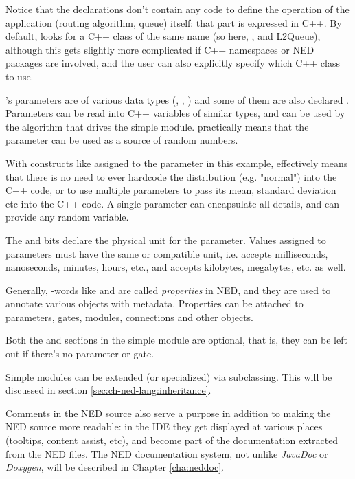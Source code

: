 Notice that the declarations don't contain any code to define the operation
of the application (routing algorithm, queue) itself:
that part is expressed in C++. By default, {\opp} looks for a
C++ class of the same name (so here, ,  and {L2Queue}),
although this gets slightly more complicated if C++ namespaces or
NED packages are involved, and the user can also explicitly specify
which C++ class to use.

's parameters are of various data types (, ,
) and some of them are also declared . Parameters
can be read into C++ variables of similar types, and can be used by the
algorithm that drives the simple module.  practically means
that the parameter can be used as a source of random numbers.

\begin{note}
    With constructs like  assigned to the 
    parameter in this example,  effectively means that
    there is no need to ever hardcode the distribution (e.g. "normal")
    into the C++ code, or to use multiple parameters to pass its mean,
    standard deviation etc into the C++ code. A single parameter can
    encapsulate all details, and can provide any random variable.
\end{note}

The  and  bits declare the physical unit
for the parameter. Values assigned to parameters must have the same or
compatible unit, i.e.  accepts milliseconds, nanoseconds,
minutes, hours, etc., and  accepts kilobytes, megabytes,
etc. as well.

Generally, -words like  and  are called
\textit{properties} in NED, and they are used to annotate various objects
with metadata. Properties can be attached to parameters, gates, modules,
connections and other objects.

Both the  and  sections in the simple module are
optional, that is, they can be left out if there's no parameter or gate.

Simple modules can be extended (or specialized) via subclassing. This will be
discussed in section \ref{sec:ch-ned-lang:inheritance}.

Comments in the NED source also serve a purpose in addition to making
the NED source more readable: in the {\opp} IDE they get displayed
at various places (tooltips, content assist, etc), and become part
of the documentation extracted from the NED files.
The NED documentation system, not unlike \textit{JavaDoc}
or \textit{Doxygen}, will be described in Chapter \ref{cha:neddoc}.

